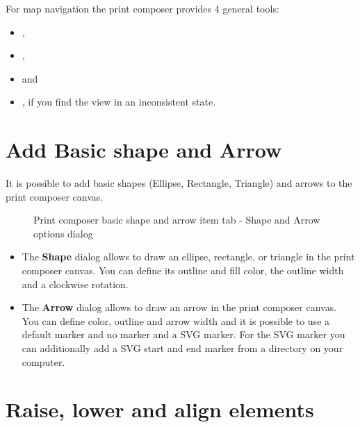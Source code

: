 For map navigation the print composer provides 4 general tools:

\begin{itemize}[label=--]
\item {},
\item {},
\item {} and
\item {}, if you find the view in an
inconsistent state.
\end{itemize}

\section{Add Basic shape and Arrow}

It is possible to add basic shapes (Ellipse, Rectangle, Triangle) and arrows
to the print composer canvas. 

\begin{figure}[ht]
\centering
{}
\hspace{1cm}
\caption{Print composer basic shape and arrow item tab - Shape and Arrow options dialog \nixcaption}\label{fig:shapearrow}
\end{figure}

\begin{itemize}[label=--]
\item The \textbf{Shape} dialog allows to draw an ellipse, rectangle, or
triangle in the print composer canvas. You can define its outline and fill
color, the outline width and a clockwise rotation.
\item The \textbf{Arrow} dialog allows to draw an arrow in the print composer
canvas. You can define color, outline and arrow width and it is possible to
use a default marker and no marker and a SVG marker. For the SVG marker you
can additionally add a SVG start and end marker from a directory on your
computer.
\end{itemize}

\section{Raise, lower and align elements}

